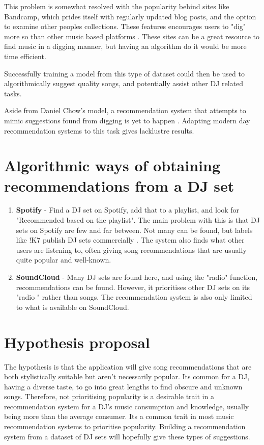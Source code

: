 This problem is somewhat resolved with the popularity behind sites like Bandcamp, which prides itself with regularly updated blog posts, and the option to examine other peoples collections. These features encourages users to "dig" more so than other music based platforms \citep{bandcamp_about_2023}.  These sites can be a great resource to find music in a digging manner, but having an algorithm do it would be more time efficient. 

Successfully training a model from this type of dataset could then be used to algorithmically suggest quality songs, and potentially assist other DJ related tasks.

Aside from Daniel Chow's model, a recommendation system that attempts to mimic suggestions found from digging is yet to happen \citep{chow_music_2020}. Adapting modern day recommendation systems to this task gives lacklustre results.

\section{Algorithmic ways of obtaining recommendations from a DJ set}
\begin{enumerate}
	\item \textbf{Spotify }- Find a DJ set on Spotify, add that to a playlist, and look for "Recommended based on the playlist". The main problem with this is that DJ sets on Spotify are few and far between. Not many can be found, but labels like !K7 publish DJ sets commercially \citep{k7_about_2023}. The system also finds what other users are listening to, often giving song recommendations that are usually quite popular and well-known.
	
	\item \textbf{SoundCloud }- Many DJ sets are found here, and using the "radio" function, recommendations can be found. However, it prioritises other DJ sets on its "radio " rather than songs. The recommendation system is also only limited to what is available on SoundCloud.
	
\end{enumerate}

\section{Hypothesis proposal}
	
The hypothesis is that the application will give song recommendations that are both stylistically suitable but aren’t necessarily popular. Its common for a DJ, having a diverse taste, to go into
great lengths to find obscure and unknown songs. Therefore, not prioritising popularity is a
desirable trait in a recommendation system for a DJ’s music consumption and knowledge, usually
being more than the average consumer. Its a common trait in most music recommendation
systems to prioritise popularity. Building a recommendation system from a dataset of DJ sets
will hopefully give these types of suggestions.	

